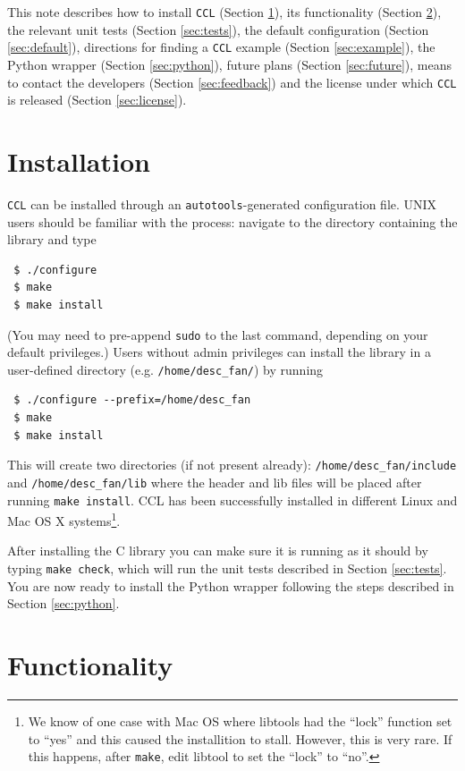 \documentclass[\docopts]{\docclass}
\begin{document}
This note describes how to install {\tt CCL} (Section \ref{sec:install}), its functionality (Section \ref{sec:func}), the relevant unit tests (Section \ref{sec:tests}), the default configuration (Section \ref{sec:default}), directions for finding a {\tt CCL} example (Section \ref{sec:example}), the Python wrapper (Section \ref{sec:python}), future plans (Section \ref{sec:future}), means to contact the developers (Section \ref{sec:feedback}) and the license under which {\tt CCL} is released (Section \ref{sec:license}).

\section{Installation}
\label{sec:install}

{\tt CCL} can be installed through an {\tt autotools}-generated configuration file. UNIX users should be familiar with the process: navigate to the directory containing the library and type
\begin{verbatim}
 $ ./configure
 $ make
 $ make install
\end{verbatim}
(You may need to pre-append {\tt sudo} to the last command, depending on your default privileges.) Users without admin privileges can install the library in a user-defined directory (e.g. {\tt /home/desc\_fan/}) by running
\begin{verbatim}
 $ ./configure --prefix=/home/desc_fan
 $ make
 $ make install
\end{verbatim}
This will create two directories (if not present already): {\tt /home/desc\_fan/include} and {\tt /home/desc\_fan/lib} where the header and lib files will be placed after running {\tt make install}. CCL has been successfully installed in different Linux and Mac OS X systems\footnote{We know of one case with Mac OS where libtools had the ``lock'' function set to ``yes'' and this caused the installition to stall. However, this is very rare. If this happens, after {\tt make}, edit libtool to set the ``lock'' to ``no''.}.

After installing the C library you can make sure it is running as it should by typing {\tt make check}, which will run the unit tests described in Section \ref{sec:tests}. You are now ready to install the Python wrapper following the steps described in Section \ref{sec:python}.

\section{Functionality}
\label{sec:func}
\end{document}
